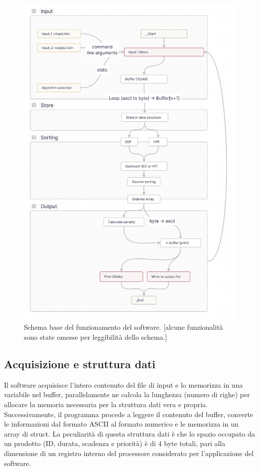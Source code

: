 \documentclass[a4paper]{report}
\begin{document}
\begin{figure}[H]
  \centering
  \includegraphics[width=\textwidth]{scheme.png}
  \caption{Schema base del funzionamento del software. [alcune funzionalità sono state omesse per leggibilità dello schema.]}
  \label{fig:schema}
\end{figure}

\subsection{Acquisizione e struttura dati}
Il software acquisisce l'intero contenuto del file di input e lo memorizza in una variabile nel buffer, parallelamente ne calcola la lunghezza (numero di righe) per allocare la memoria necessaria per la struttura dati vera e propria. Successivamente, il programma procede a leggere il contenuto del buffer, converte le informazioni dal formato ASCII al formato numerico e le memorizza in un array di struct. La peculiarità di questa struttura dati è che lo spazio occupato da un prodotto (ID, durata, scadenza e priorità) è di 4 byte totali, pari alla dimensione di un registro interno del processore considerato per l'applicazione del software.
\end{document}
